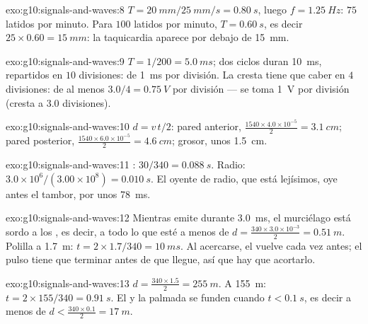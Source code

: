 \begin{solution}{exo:g10:signals-and-waves:8}
$T = \qty{20}{mm}/\qty{25}{mm/s} = \qty{0.80}{s}$, luego
$f = \qty{1.25}{Hz}$: $75$ latidos por minuto. Para $100$ latidos por
minuto, $T = \qty{0.60}{s}$, es decir
$25 \times 0.60 = \qty{15}{mm}$: la taquicardia aparece por debajo de
\qty{15}{mm}.
\end{solution}

\begin{solution}{exo:g10:signals-and-waves:9}
$T = 1/200 = \qty{5.0}{ms}$; dos ciclos duran \qty{10}{ms}, repartidos
en $10$ divisiones:  de \qty{1}{ms} por división. La
cresta tiene que caber en $4$ divisiones:  de al menos
$3.0/4 = \qty{0.75}{V}$ por división --- se toma \qty{1}{V} por división
(cresta a $3.0$ divisiones).
\end{solution}

\begin{solution}{exo:g10:signals-and-waves:10}
$d = v\,t/2$: pared anterior,
$\frac{1540 \times 4.0\times10^{-5}}{2} = \qty{3.1}{cm}$; pared
posterior, $\frac{1540 \times 6.0\times10^{-5}}{2} = \qty{4.6}{cm}$;
grosor, unos \qty{1.5}{cm}.
\end{solution}

\begin{solution}{exo:g10:signals-and-waves:11}
: $30/340 = \qty{0.088}{s}$. Radio:
$3.0\times10^{6}/(3.00\times10^{8}) = \qty{0.010}{s}$. El oyente de
radio, que está lejísimos, oye antes el tambor, por unos \qty{78}{ms}.
\end{solution}

\begin{solution}{exo:g10:signals-and-waves:12}
Mientras emite durante \qty{3.0}{ms}, el murciélago está sordo a los
, es decir, a todo lo que esté a menos de
$d = \frac{340 \times 3.0\times10^{-3}}{2} = \qty{0.51}{m}$. Polilla a
\qty{1.7}{m}: $t = 2 \times 1.7/340 = \qty{10}{ms}$. Al acercarse, el
 vuelve cada vez antes; el pulso tiene que terminar antes de que
llegue, así que hay que acortarlo.
\end{solution}

\begin{solution}{exo:g10:signals-and-waves:13}
$d = \frac{340 \times 1.5}{2} = \qty{255}{m}$. A \qty{155}{m}:
$t = 2 \times 155/340 = \qty{0.91}{s}$. El  y la palmada se funden
cuando $t < \qty{0.1}{s}$, es decir a menos de
$d < \frac{340 \times 0.1}{2} = \qty{17}{m}$.
\end{solution}

